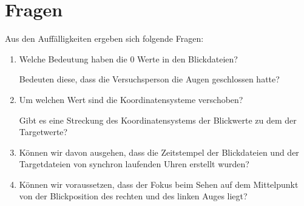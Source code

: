 \chapter{Fragen}
Aus den Auffälligkeiten ergeben sich folgende Fragen:
\begin{enumerate}
	\item Welche Bedeutung haben die 0 Werte in den Blickdateien?
	
	Bedeuten diese, dass die Versuchsperson die Augen geschlossen hatte?
	\item Um welchen Wert sind die Koordinatensysteme verschoben?
	
	Gibt es eine Streckung des Koordinatensystems der Blickwerte zu dem der Targetwerte?
	\item K\"onnen wir davon ausgehen, dass die Zeitstempel der Blickdateien und der Targetdateien von synchron laufenden Uhren erstellt wurden?
	\item K\"onnen wir voraussetzen, dass der Fokus beim Sehen auf dem Mittelpunkt von der Blickposition des rechten und des linken Auges liegt?
\end{enumerate}